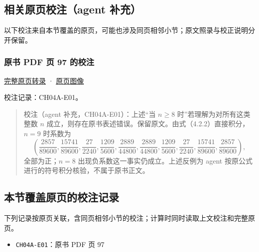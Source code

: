 \documentclass[
  10pt,
  fontset=fandol]{ctexart}
\providecommand{\tightlist}{%
  \setlength{\itemsep}{0pt}\setlength{\parskip}{0pt}}
\begin{document}
\subsection{相关原页校注（agent 补充）}\label{ux76f8ux5173ux539fux9875ux6821ux6ce8agent-ux8865ux5145}

以下校注来自本节覆盖的原页，可能也涉及同页相邻小节；原文照录与校正说明分开保留。

\subsubsection{原书 PDF 页 97 的校注}\label{ux539fux4e66-pdf-ux9875-97-ux7684ux6821ux6ce8}

\href{../pages/pdf-097.md}{完整原页转录} · \href{../../source-images/pdf-097.jpeg}{原页图像}

校注记录：CH04A-E01。

\begin{quote}
校注（agent 补充，CH04A-E01）：上述``当 \(n\geq8\) 时''若理解为对所有这类整数 \(n\) 成立，则存在原书表述错误。保留原文。由式（4.2.2）直接积分，\(n=9\) 时系数为 \[
\left(\frac{2857}{89600},\frac{15741}{89600},\frac{27}{2240},\frac{1209}{5600},\frac{2889}{44800},\frac{2889}{44800},\frac{1209}{5600},\frac{27}{2240},\frac{15741}{89600},\frac{2857}{89600}\right),
\] 全部为正；\(n=8\) 出现负系数这一事实仍成立。上述反例为 agent 按原公式进行的符号积分核验，不属于原书正文。
\end{quote}

\subsection{本节覆盖原页的校注记录}\label{ux672cux8282ux8986ux76d6ux539fux9875ux7684ux6821ux6ce8ux8bb0ux5f55}

下列记录按原页关联，含同页相邻小节的校注；计算时同时读取上文校注和完整原页。

\begin{itemize}
\tightlist
\item
  \texttt{CH04A-E01}：原书 PDF 页 97
\end{itemize}
\end{document}
